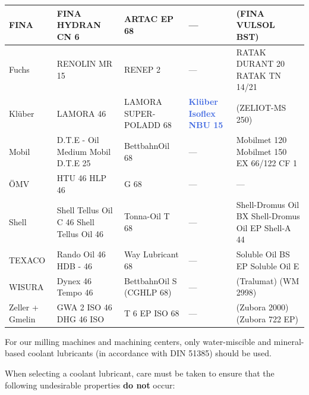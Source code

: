 \begin{longtable}{|p{2.2cm}|p{2.7cm}|p{3cm}|p{3cm}|p{4.5cm}|}
    \hline
    FINA & FINA \newline HYDRAN CN 6 & ARTAC EP 68 & --- & (FINA VULSOL BST) \\
    \hline
    Fuchs & RENOLIN MR 15 & RENEP 2 & --- & RATAK DURANT 20 \newline RATAK TN 14/21 \\
    \hline
    Klüber & LAMORA 46 & LAMORA SUPER-POLADD 68 & \textcolor{RoyalBlue}{\textbf{Klüber Isoflex NBU 15}} & (ZELIOT-MS 250) \\
    \hline
    Mobil & D.T.E - Oil Medium \newline Mobil D.T.E 25 & BettbahnOil 68 & --- & Mobilmet 120 \newline Mobilmet 150 \newline EX 66/122 CF 1 \\
    \hline
    ÖMV & HTU 46 \newline HLP 46 & G 68 & --- & --- \\
    \hline
    Shell & Shell Tellus Oil C 46 \newline Shell Tellus Oil 46 & Tonna-Oil T 68 & --- & Shell-Dromus Oil BX \newline Shell-Dromus Oil EP \newline Shell-A 44 \\
    \hline
    TEXACO & Rando Oil 46 \newline HDB - 46 & Way Lubricant 68 & --- & Soluble Oil BS EP \newline Soluble Oil E \\
    \hline
    WISURA & Dynex 46 \newline Tempo 46 & BettbahnOil \newline 68 S (CGHLP 68) & --- & (Tralumat) \newline (WM 2998) \\
    \hline
    Zeller + Gmelin & GWA 2 ISO 46 \newline DHG 46 ISO & T 6 EP ISO 68 & --- & (Zubora 2000) \newline (Zubora 722 EP) \\
    \hline
\end{longtable}

\setcounter{section}{7}

For our milling machines and machining centers, only water-miscible and mineral-based coolant lubricants (in accordance with DIN 51385) should be used.

When selecting a coolant lubricant, care must be taken to ensure that the following undesirable properties \textbf{do not} occur:

